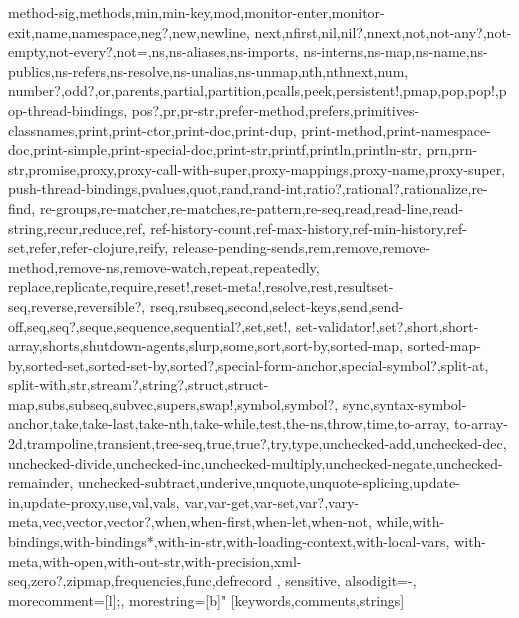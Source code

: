 {{method-sig,methods,min,min-key,mod,monitor-enter,monitor-exit,name,namespace,neg?,new,newline,%
next,nfirst,nil,nil?,nnext,not,not-any?,not-empty,not-every?,not=,ns,ns-aliases,ns-imports,%
ns-interns,ns-map,ns-name,ns-publics,ns-refers,ns-resolve,ns-unalias,ns-unmap,nth,nthnext,num,%
number?,odd?,or,parents,partial,partition,pcalls,peek,persistent!,pmap,pop,pop!,pop-thread-bindings,%
pos?,pr,pr-str,prefer-method,prefers,primitives-classnames,print,print-ctor,print-doc,print-dup,%
print-method,print-namespace-doc,print-simple,print-special-doc,print-str,printf,println,println-str,%
prn,prn-str,promise,proxy,proxy-call-with-super,proxy-mappings,proxy-name,proxy-super,%
push-thread-bindings,pvalues,quot,rand,rand-int,ratio?,rational?,rationalize,re-find,%
re-groups,re-matcher,re-matches,re-pattern,re-seq,read,read-line,read-string,recur,reduce,ref,%
ref-history-count,ref-max-history,ref-min-history,ref-set,refer,refer-clojure,reify,%
release-pending-sends,rem,remove,remove-method,remove-ns,remove-watch,repeat,repeatedly,%
replace,replicate,require,reset!,reset-meta!,resolve,rest,resultset-seq,reverse,reversible?,%
rseq,rsubseq,second,select-keys,send,send-off,seq,seq?,seque,sequence,sequential?,set,set!,%
set-validator!,set?,short,short-array,shorts,shutdown-agents,slurp,some,sort,sort-by,sorted-map,%
sorted-map-by,sorted-set,sorted-set-by,sorted?,special-form-anchor,special-symbol?,split-at,%
split-with,str,stream?,string?,struct,struct-map,subs,subseq,subvec,supers,swap!,symbol,symbol?,%
sync,syntax-symbol-anchor,take,take-last,take-nth,take-while,test,the-ns,throw,time,to-array,%
to-array-2d,trampoline,transient,tree-seq,true,true?,try,type,unchecked-add,unchecked-dec,%
unchecked-divide,unchecked-inc,unchecked-multiply,unchecked-negate,unchecked-remainder,%
unchecked-subtract,underive,unquote,unquote-splicing,update-in,update-proxy,use,val,vals,%
var,var-get,var-set,var?,vary-meta,vec,vector,vector?,when,when-first,when-let,when-not,%
while,with-bindings,with-bindings*,with-in-str,with-loading-context,with-local-vars,%
with-meta,with-open,with-out-str,with-precision,xml-seq,zero?,zipmap,frequencies,func,defrecord
},%
   sensitive,%
   alsodigit=-,%
   morecomment=[l];,%
   morestring=[b]"%
  }[keywords,comments,strings]%

